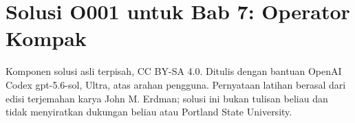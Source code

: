 
\section*{Solusi O001 untuk Bab 7: Operator Kompak}
\begin{center}
\small
Komponen solusi asli terpisah, CC BY-SA 4.0. Ditulis dengan bantuan
OpenAI Codex gpt-5.6-sol, Ultra, atas arahan pengguna. Pernyataan latihan
berasal dari edisi terjemahan karya John M. Erdman; solusi ini bukan tulisan
beliau dan tidak menyiratkan dukungan beliau atau Portland State University.
\end{center}

